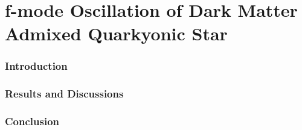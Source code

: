 \chapter{f-mode Oscillation of Dark Matter Admixed Quarkyonic Star}
\label{C4} 
\subsection{Introduction}
\subsection{Results and Discussions}
\subsection{Conclusion}



